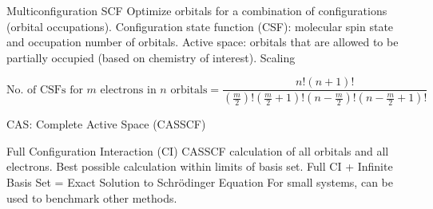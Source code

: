 \documentclass[aspectratio=169]{beamer}
\begin{document}
\begin{frame}{Multiconfiguration SCF}
Optimize orbitals for a combination of configurations (orbital occupations).\newline
\newline
Configuration state function (CSF): molecular spin state and occupation number of orbitals.\newline
\newline
Active space: orbitals that are allowed to be partially occupied (based on chemistry of interest).\newline
\newline
Scaling

\begin{equation*}
    \mbox{No. of CSFs for $m$ electrons in $n$ orbitals} = \frac{n!(n+1)!}{(\frac{m}{2})!(\frac{m}{2}+1)!(n-\frac{m}{2})!(n-\frac{m}{2}+1)!}
\end{equation*}

CAS: Complete Active Space (CASSCF)

\end{frame}

\begin{frame}{Full Configuration Interaction (CI)}
CASSCF calculation of all orbitals and all electrons.\newline
\newline
Best possible calculation within limits of basis set.\newline
\newline
Full CI + Infinite Basis Set = Exact Solution to Schr\"odinger Equation\newline
\newline
For small systems, can be used to benchmark other methods.
    
\end{frame}
\end{document}
